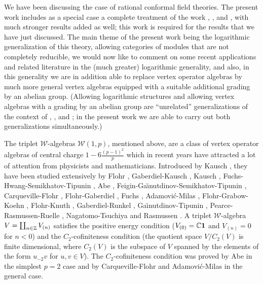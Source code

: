 \documentclass[12pt]{article}
\begin{document}
We have been discussing the case of rational conformal field theories.
The present work includes as a special case a complete treatment of
the work \cite{tensor1}, \cite{tensor2}, \cite{tensor3} and
\cite{tensor4}, with much stronger results added as well; this work is
required for the results that we have just discussed.  The main theme
of the present work being the logarithmic generalization of this
theory, allowing categories of modules that are not completely
reducible, we would now like to comment on some recent applications
and related literature in the (much greater) logarithmic generality,
and also, in this generality we are in addition able to replace vertex
operator algebras by much more general vertex algebras equipped with a
suitable additional grading by an abelian group.  (Allowing
logarithmic structures and allowing vertex algebras with a grading by
an abelian group are ``unrelated'' generalizations of the context of
\cite{tensor1}, \cite{tensor2}, \cite{tensor3} and \cite{tensor4}; in
the present work we are able to carry out both generalizations
simultaneously.)

The triplet $\mathcal{W}$-algebras $\mathcal{W}(1,p)$, mentioned above,
are a class of vertex operator algebras
of central charge $1-6\frac{(p-1)^{2}}{p}$ which in recent years have
attracted a lot of attention from physicists and mathematicians.
Introduced by Kausch \cite{K1}, they 
have been studied extensively by Flohr \cite{Fl1} \cite{Fl2},
Gaberdiel-Kausch \cite{GK1} \cite{GK3}, Kausch \cite{K2},
Fuchs-Hwang-Semikhatov-Tipunin \cite{FHST}, Abe \cite{A},
Feigin-Ga{\u\i}nutdinov-Semikhatov-Tipunin \cite{FGST1}
\cite{FGST3}, Carqueville-Flohr \cite{CF}, Flohr-Gaberdiel \cite{FG},
Fuchs \cite{Fu}, Adamovi\'{c}-Milas \cite{AM2} \cite{AM5}
\cite{AM7}, Flohr-Grabow-Koehn \cite{FGK}, Flohr-Knuth \cite{FK},
Gaberdiel-Runkel \cite{GR1} \cite{GR2}, Ga{\u\i}nutdinov-Tipunin
\cite{GT}, Pearce-Rasmussen-Ruelle \cite{PRR1} \cite{PRR2},
Nagatomo-Tsuchiya \cite{NT2} and Rasmussen \cite{Ra4}.  A triplet
$\mathcal{W}$-algebra $V=\coprod_{n\in \mathbb{Z}}V_{(n)}$ satisfies the
positive energy condition ($V_{(0)}=\mathbb{C}\mathbf{1}$ and $V_{(n)}=0$ for
$n<0$) and the $C_{2}$-cofiniteness condition (the quotient space
$V/C_{2}(V)$ is finite dimensional, where $C_{2}(V)$ is the subspace
of $V$ spanned by the elements of the form $u_{-2}v$ for $u, v\in V$).
The $C_{2}$-cofiniteness condition was proved by Abe \cite{A} in the
simplest $p=2$ case and by Carqueville-Flohr \cite{CF} and
Adamovi\'{c}-Milas \cite{AM2} in the general case.
\end{document}
